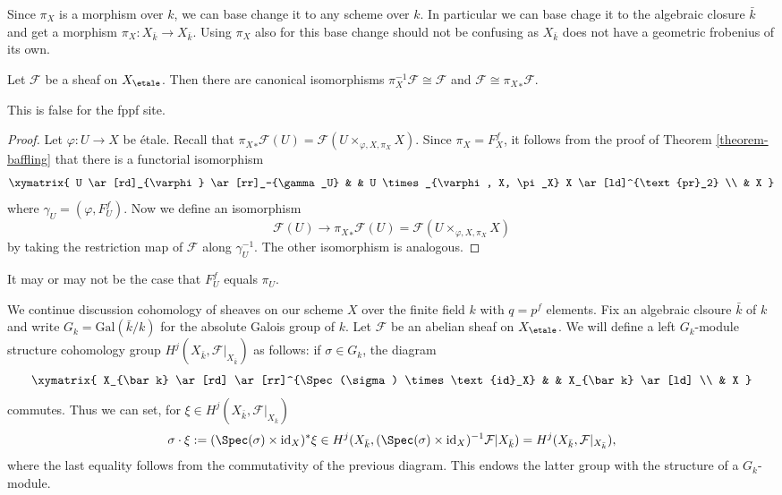 \noindent
Since $\pi_X$ is a morphism over $k$, we can base change it to any scheme over
$k$. In particular we can base chage it to the algebraic closure $\bar k$
and get a morphism $\pi_X : X_{\bar k} \to X_{\bar k}$. Using $\pi_X$ also
for this base change should not be
confusing as $X_{\bar k}$ does not have a geometric frobenius of its own.

\begin{lemma}
\label{lemma-sheaf-over-finite-field-has-frobenius-descent}
Let $\mathcal{F}$ be a sheaf on $X_\etale$.
Then there are canonical isomorphisms
$\pi_X^{-1} \mathcal{F} \cong \mathcal{F}$ and
$\mathcal{F} \cong {\pi_X}_*\mathcal{F}$.
\end{lemma}

\noindent
This is false for the fppf site.

\begin{proof}
Let $\varphi : U \to X$ be \'etale. Recall that
${\pi_X}_* \mathcal{F} (U) = \mathcal{F} (U \times_{\varphi, X, \pi_X} X)$.
Since $\pi_X = F_X^f$, it follows from the proof of
Theorem \ref{theorem-baffling} that there is a functorial isomorphism
$$
\xymatrix{
U \ar[rd]_{\varphi} \ar[rr]_-{\gamma_U}
& & U \times_{\varphi, X, \pi_X} X \ar[ld]^{\text{pr}_2} \\
& X
}
$$
where $\gamma_U = (\varphi, F_U^f)$. Now we define an
isomorphism
$$
\mathcal{F} (U) \longrightarrow {\pi_X}_* \mathcal{F} (U) =
\mathcal{F} (U \times_{\varphi, X, \pi_X} X)
$$
by taking the restriction map of $\mathcal{F}$ along $\gamma_U^{-1}$.
The other isomorphism is analogous.
\end{proof}

\begin{remark}
\label{remark-may-be-confusing}
It may or may not be the case that $F^f_U$ equals $\pi_U$.
\end{remark}

\noindent
We continue discussion cohomology of sheaves on our scheme $X$ over
the finite field $k$ with $q = p^f$ elements.
Fix an algebraic clsoure $\bar k$ of $k$ and write $G_k =
\text{Gal}(\bar k/k)$ for the absolute Galois group of $k$.
Let $\mathcal{F}$ be an abelian sheaf on $X_\etale$.
We will define a left $G_k$-module structure
cohomology group $H^j (X_{\bar k}, \mathcal{F}|_{X_{\bar k}})$
as follows: if $\sigma \in G_k$, the diagram
$$
\xymatrix{
X_{\bar k} \ar[rd] \ar[rr]^{\Spec(\sigma) \times \text{id}_X} & &
X_{\bar k} \ar[ld] \\
& X
}
$$
commutes. Thus we can set, for $\xi \in H^j (X_{\bar k}, \mathcal{F}|_{X_{\bar
k}})$
$$
\sigma \cdot \xi := (\Spec(\sigma) \times \text{id}_X)^*\xi \in
H^j(X_{\bar k}, (\Spec(\sigma) \times \text{id}_X)^{-1}
\mathcal{F}|{X_{\bar k}})
= H^j (X_{\bar k}, \mathcal{F}|_{X_{\bar k}}),
$$
where the last equality follows from the commutativity of the previous diagram.
This endows the latter group with the structure of a $G_k$-module.

